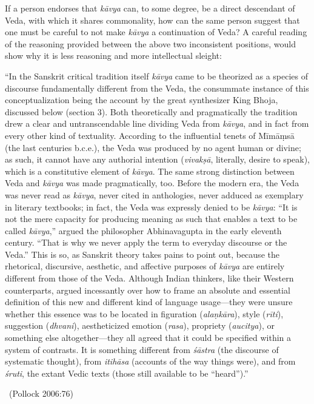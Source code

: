 If a person endorses that \textit{kāvya} can, to some degree, be a direct descendant of Veda, with which it shares commonality, how can the same person suggest that one must be careful to not make \textit{kāvya} a continuation of Veda? A careful reading of the reasoning provided between the above two inconsistent positions, would show why it is less reasoning and more intellectual sleight:

\begin{myquote}
“In the Sanskrit critical tradition itself \textit{kāvya} came to be theorized as a species of discourse fundamentally different from the Veda, the consummate instance of this conceptualization being the account by the great synthesizer King Bhoja, discussed below (section 3). Both theoretically and pragmatically the tradition drew a clear and untranscendable line dividing Veda from \textit{kāvya}, and in fact from every other kind of textuality. According to the influential tenets of Mīmāṃsā (the last centuries b.c.e.), the Veda was produced by no agent human or divine; as such, it cannot have any authorial intention (\textit{vivakṣā}, literally, desire to speak), which is a constitutive element of \textit{kāvya}. The same strong distinction between Veda and \textit{kāvya} was made pragmatically, too. Before the modern era, the Veda was never read as \textit{kāvya}, never cited in anthologies, never adduced as exemplary in literary textbooks; in fact, the Veda was expressly denied to be \textit{kāvya}: “It is not the mere capacity for producing meaning as such that enables a text to be called \textit{kāvya},” argued the philosopher Abhinavagupta in the early eleventh century. “That is why we never apply the term to everyday discourse or the Veda.” This is so, as Sanskrit theory takes pains to point out, because the rhetorical, discursive, aesthetic, and affective purposes of \textit{kāvya} are entirely different from those of the Veda. Although Indian thinkers, like their Western counterparts, argued incessantly over how to frame an absolute and essential definition of this new and different kind of language usage—they were unsure whether this essence was to be located in figuration (\textit{alaṇkāra}), style (\textit{rīti}), suggestion (\textit{dhvani}), aestheticized emotion (\textit{rasa}), propriety (\textit{aucitya}), or something else altogether—they all agreed that it could be specified within a system of contrasts. It is something different from \textit{śāstra} (the discourse of systematic thought), from \textit{itihāsa} (accounts of the way things were), and from \textit{śruti}, the extant Vedic texts (those still available to be “heard”).”

~\hfill (Pollock 2006:76)
\end{myquote}


